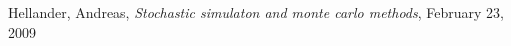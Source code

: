 \begin{thebibliography}{99}
	 Hellander, Andreas, \emph{Stochastic simulaton and monte carlo methods}, February 23, 2009
\end{thebibliography}	
